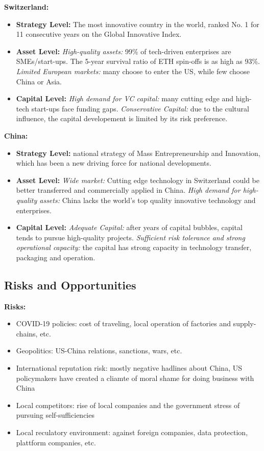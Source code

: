 \documentclass[a4paper]{extarticle}
\begin{document}
\textbf{Switzerland:}

\begin{itemize}
    \item \textbf{Strategy Level:} The most innovative country in the world, ranked No. 1 for 11 consecutive years on the Global Innovative Index.
    \item \textbf{Asset Level:} \textit{High-quality assets:} 99\% of tech-driven enterprises are SMEs/start-ups. The 5-year survival ratio of ETH spin-offs is as high as 93\%. \textit{Limited European markets:} many choose to enter the US, while few choose China or Asia.
    \item \textbf{Capital Level:} \textit{High demand for VC capital:} many cutting edge and high-tech start-ups face funding gaps. \textit{Conservative Capital:} due to the cultural influence, the capital developement is limited by its risk preference.
\end{itemize}

\textbf{China:}

\begin{itemize}
    \item \textbf{Strategy Level:} national strategy of Mass Entrepreneurship and Innovation, which has been a new driving force for national developments.
    \item \textbf{Asset Level:} \textit{Wide market:} Cutting edge technology in Switzerland could be better transferred and commercially applied in China. \textit{High demand for high-quality assets:} China lacks the world's top quality innovative technology and enterprises.
    \item \textbf{Capital Level:} \textit{Adequate Capital:} after years of capital bubbles, capital tends to pursue high-quality projects. \textit{Sufficient risk tolerance and strong operational capacity:} the capital has strong capacity in technology transfer, packaging and operation.
\end{itemize}

\subsection{Risks and Opportunities}

\textbf{Risks:}

\begin{itemize}
    \item COVID-19 policies: cost of traveling, local operation of factories and supply-chains, etc.
    \item Geopolitics: US-China relations, sanctions, wars, etc.
    \item International reputation risk: mostly negative hadlines about China, US policymakers have created a cliamte of moral shame for doing business with China
    \item Local competitors: rise of local companies and the government stress of pursuing self-sufficiencies
    \item Local reculatory environment: against foreign companies, data protection, plattform companies, etc.
\end{itemize}
\end{document}
